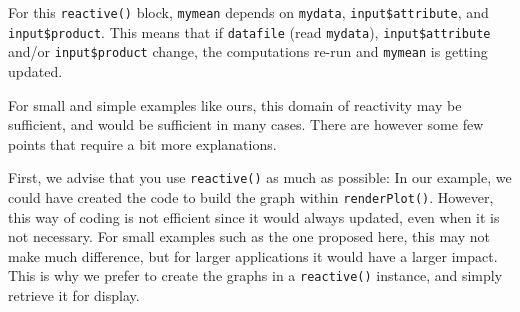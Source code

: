 \documentclass[
]{book}
\newenvironment{Shaded}{\begin{snugshade}}{\end{snugshade}}
\newcommand{\AttributeTok}[1]{\textcolor[rgb]{0.77,0.63,0.00}{#1}}
\newcommand{\DecValTok}[1]{\textcolor[rgb]{0.00,0.00,0.81}{#1}}
\newcommand{\FunctionTok}[1]{\textcolor[rgb]{0.00,0.00,0.00}{#1}}
\newcommand{\NormalTok}[1]{#1}
\newcommand{\OtherTok}[1]{\textcolor[rgb]{0.56,0.35,0.01}{#1}}
\newcommand{\SpecialCharTok}[1]{\textcolor[rgb]{0.00,0.00,0.00}{#1}}
\newcommand{\StringTok}[1]{\textcolor[rgb]{0.31,0.60,0.02}{#1}}
\begin{document}
\begin{Shaded}
\end{Shaded}

For this \texttt{reactive()} block, \texttt{mymean} depends on \texttt{mydata}, \texttt{input\$attribute}, and \texttt{input\$product}. This means that if \texttt{datafile} (read \texttt{mydata}), \texttt{input\$attribute} and/or \texttt{input\$product} change, the computations re-run and \texttt{mymean} is getting updated.

For small and simple examples like ours, this domain of reactivity may be sufficient, and would be sufficient in many cases. There are however some few points that require a bit more explanations.

First, we advise that you use \texttt{reactive()} as much as possible: In our example, we could have created the code to build the graph within \texttt{renderPlot()}. However, this way of coding is not efficient since it would always updated, even when it is not necessary. For small examples such as the one proposed here, this may not make much difference, but for larger applications it would have a larger impact. This is why we prefer to create the graphs in a \texttt{reactive()} instance, and simply retrieve it for display.
\end{document}
